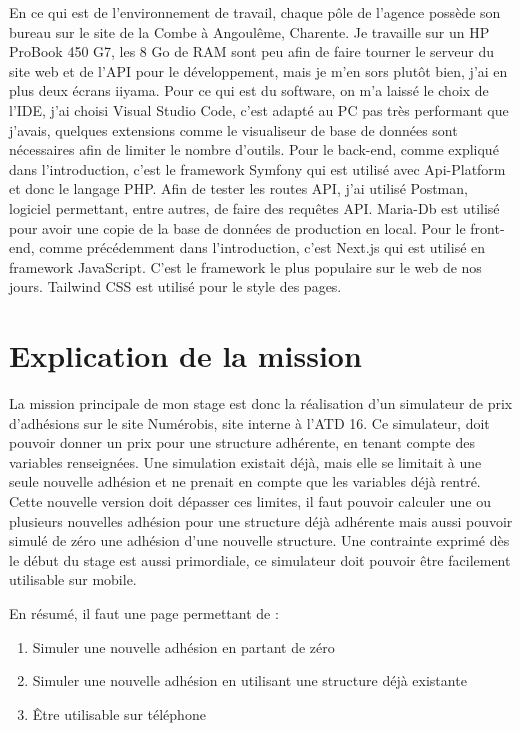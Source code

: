 \documentclass[a4paper,12pt]{report}
\begin{document}
En ce qui est de l'environnement de travail, chaque pôle de l'agence possède son bureau sur le site de la Combe à Angoulême, Charente. Je travaille sur un HP ProBook 450 G7, les 8 Go de RAM sont peu afin de faire tourner le serveur du site web et de l'API pour le développement, mais je m'en sors plutôt bien, j'ai en plus deux écrans iiyama. Pour ce qui est du software, on m'a laissé le choix de l'IDE, j'ai choisi Visual Studio Code, c'est adapté au PC pas très performant que j'avais, quelques extensions comme le visualiseur de base de données sont nécessaires afin de limiter le nombre d'outils. Pour le back-end, comme expliqué dans l'introduction, c'est le framework Symfony qui est utilisé avec Api-Platform et donc le langage PHP. Afin de tester les routes API, j'ai utilisé Postman, logiciel permettant, entre autres, de faire des requêtes API. Maria-Db est utilisé pour avoir une copie de la base de données de production en local. Pour le front-end, comme précédemment dans l'introduction, c'est Next.js qui est utilisé en framework JavaScript. C'est le framework le plus populaire sur le web de nos jours. Tailwind CSS est utilisé pour le style des pages.


\section{Explication de la mission}

La mission principale de mon stage est donc la réalisation d'un simulateur de prix d'adhésions sur le site Numérobis, site interne à l'ATD 16. Ce simulateur, doit pouvoir donner un prix pour une structure adhérente, en tenant compte des variables renseignées. Une simulation existait déjà, mais elle se limitait à une seule nouvelle adhésion et ne prenait en compte que les variables déjà rentré. Cette nouvelle version doit dépasser ces limites, il faut pouvoir calculer une ou plusieurs nouvelles adhésion pour une structure déjà adhérente mais aussi pouvoir simulé de zéro une adhésion d'une nouvelle structure. Une contrainte exprimé dès le début du stage est aussi primordiale, ce simulateur doit pouvoir être facilement utilisable sur mobile.

En résumé, il faut une page permettant de :
\begin{enumerate}
    \item Simuler une nouvelle adhésion en partant de zéro
    \item Simuler une nouvelle adhésion en utilisant une structure déjà existante
    \item Être utilisable sur téléphone
\end{enumerate}
\end{document}
